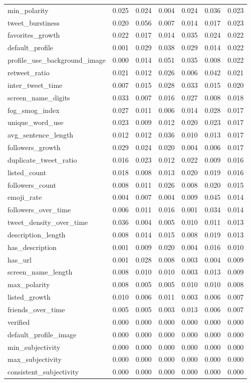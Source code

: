 \begin{tabular}{lrrrrrr}
min_polarity & 0.025 & 0.024 & 0.004 & 0.024 & 0.036 & 0.023 \\
tweet_burstiness & 0.020 & 0.056 & 0.007 & 0.014 & 0.017 & 0.023 \\
favorites_growth & 0.022 & 0.017 & 0.014 & 0.035 & 0.024 & 0.022 \\
default_profile & 0.001 & 0.029 & 0.038 & 0.029 & 0.014 & 0.022 \\
profile_use_background_image & 0.000 & 0.014 & 0.051 & 0.035 & 0.008 & 0.022 \\
retweet_ratio & 0.021 & 0.012 & 0.026 & 0.006 & 0.042 & 0.021 \\
inter_tweet_time & 0.007 & 0.015 & 0.028 & 0.033 & 0.015 & 0.020 \\
screen_name_digits & 0.033 & 0.007 & 0.016 & 0.027 & 0.008 & 0.018 \\
fog_smog_index & 0.027 & 0.011 & 0.006 & 0.014 & 0.028 & 0.017 \\
unique_word_use & 0.023 & 0.009 & 0.012 & 0.020 & 0.023 & 0.017 \\
avg_sentence_length & 0.012 & 0.012 & 0.036 & 0.010 & 0.013 & 0.017 \\
followers_growth & 0.029 & 0.024 & 0.020 & 0.004 & 0.006 & 0.017 \\
duplicate_tweet_ratio & 0.016 & 0.023 & 0.012 & 0.022 & 0.009 & 0.016 \\
listed_count & 0.018 & 0.008 & 0.013 & 0.020 & 0.019 & 0.016 \\
followers_count & 0.008 & 0.011 & 0.026 & 0.008 & 0.020 & 0.015 \\
emoji_rate & 0.004 & 0.007 & 0.004 & 0.009 & 0.045 & 0.014 \\
followers_over_time & 0.006 & 0.011 & 0.016 & 0.001 & 0.034 & 0.014 \\
tweet_density_over_time & 0.036 & 0.004 & 0.005 & 0.010 & 0.011 & 0.013 \\
description_length & 0.008 & 0.014 & 0.015 & 0.008 & 0.019 & 0.013 \\
has_description & 0.001 & 0.009 & 0.020 & 0.004 & 0.016 & 0.010 \\
has_url & 0.001 & 0.028 & 0.008 & 0.003 & 0.004 & 0.009 \\
screen_name_length & 0.008 & 0.010 & 0.010 & 0.003 & 0.013 & 0.009 \\
max_polarity & 0.008 & 0.005 & 0.005 & 0.010 & 0.010 & 0.008 \\
listed_growth & 0.010 & 0.006 & 0.011 & 0.003 & 0.006 & 0.007 \\
friends_over_time & 0.005 & 0.005 & 0.003 & 0.013 & 0.006 & 0.007 \\
verified & 0.000 & 0.000 & 0.000 & 0.000 & 0.000 & 0.000 \\
default_profile_image & 0.000 & 0.000 & 0.000 & 0.000 & 0.000 & 0.000 \\
min_subjectivity & 0.000 & 0.000 & 0.000 & 0.000 & 0.000 & 0.000 \\
max_subjectivity & 0.000 & 0.000 & 0.000 & 0.000 & 0.000 & 0.000 \\
consistent_subjectivity & 0.000 & 0.000 & 0.000 & 0.000 & 0.000 & 0.000 \\
\bottomrule
\end{tabular}
